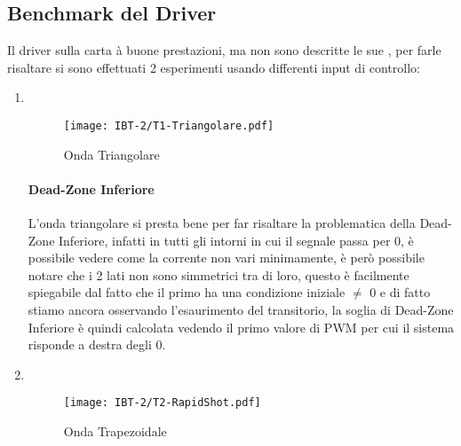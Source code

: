 \subsection{Benchmark del Driver}
Il driver sulla carta à buone prestazioni, ma non sono descritte le sue \nonLinearita, per farle risaltare si sono effettuati 2 esperimenti usando differenti input di controllo:
\begin{enumerate}
	\item {} \\ \vspace{-11mm}
	      \begin{figure}[h]
		      
		      \centering
		      \texttt{[image: IBT-2/T1-Triangolare.pdf]}
		      \caption[Esperimento con Onda Triangolare]{Onda Triangolare}
	      \end{figure}\vspace{-10mm}
	      \paragraph{Dead-Zone Inferiore} L'onda triangolare si presta bene per far risaltare la problematica della Dead-Zone Inferiore, infatti in tutti gli intorni in cui il segnale passa per 0, è possibile vedere come la corrente non vari minimamente, è però possibile notare che i 2 lati non sono simmetrici tra di loro, questo è facilmente spiegabile dal fatto che il primo ha una condizione iniziale $ \neq $ 0 e di fatto stiamo ancora osservando l'esaurimento del transitorio, la soglia di Dead-Zone Inferiore è quindi calcolata vedendo il primo valore di PWM  per cui il sistema risponde a destra degli 0.      
	      
	      \newpage
	\item {} \\
	      \begin{figure}[h]
		      \centering
		      \texttt{[image: IBT-2/T2-RapidShot.pdf]}
		      \caption[Esperimento con Onda Trapezoidale]{Onda Trapezoidale}
	      \end{figure}  \vspace{-10mm}

\end{enumerate}
